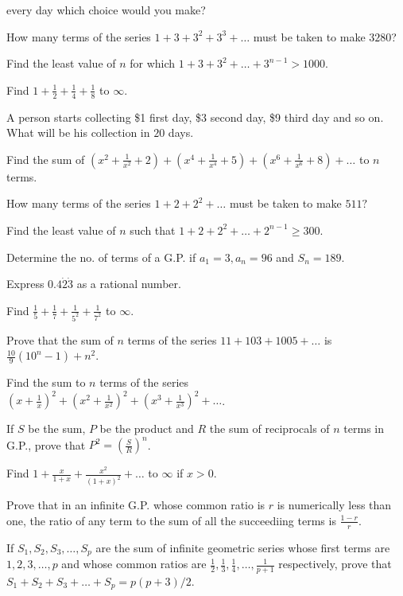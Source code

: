   every day which choice would you make?
\item How many terms of the series $1 + 3 + 3^2 + 3^3 + \ldots$ must be taken to make $3280$?
\item Find the least value of $n$ for which $1 + 3 + 3^2 + \ldots + 3^{n - 1} > 1000$.
\item Find $1 + \frac{1}{2} + \frac{1}{4} + \frac{1}{8}$ to $\infty$.
\item A person starts collecting \$1 first day, \$3 second day, \$9 third day and so on. What will be his collection in $20$
  days.
\item Find the sum of $\left(x^2 + \frac{1}{x^2} + 2\right) + \left(x^4 + \frac{1}{x^4} + 5\right) + \left(x^6 + \frac{1}{x^6} +
  8\right) + \ldots$ to $n$ terms.
\item How many terms of the series $1 + 2 + 2^2 + \ldots$ must be taken to make $511?$
\item Find the least value of $n$ such that $1 + 2 + 2^2 + \ldots + 2^{n - 1} \geq 300$.
\item Determine the no. of terms of a G.P. if $a_1 = 3, a_n = 96$ and $S_n = 189$.
\item Express $0.4\dot{2}\dot{3}$ as a rational number.
\item Find $\frac{1}{5} + \frac{1}{7} + \frac{1}{5^2} + \frac{1}{7^2}$ to $\infty$.
\item Prove that the sum of $n$ terms of the series $11 + 103 + 1005+ \ldots$ is $\frac{10}{9}(10^n - 1) + n^2$.
\item Find the sum to $n$ terms of the series $\left(x + \frac{1}{x}\right)^2 + \left(x^2 + \frac{1}{x^2}\right)^2 + \left(x^3 +
  \frac{1}{x^3}\right)^2 + \ldots$.
\item If $S$ be the sum, $P$ be the product and $R$ the sum of reciprocals of $n$ terms in G.P., prove that $P^2 =
  \left(\frac{S}{R}\right)^n$.
\item Find $1 + \frac{x}{1 + x} + \frac{x^2}{(1 + x)^2} + \ldots$ to $\infty$ if $x > 0$.
\item Prove that in an infinite G.P. whose common ratio is $r$ is numerically less than one, the ratio of any term to the
  sum of all the succeediing terms is $\frac{1 - r}{r}$.
\item If $S_1, S_2, S_3, \ldots, S_p$ are the sum of infinite geometric series whose first terms are $1, 2, 3, \ldots, p$
  and whose common ratios are $\frac{1}{2}, \frac{1}{3}, \frac{1}{4}, \ldots, \frac{1}{p + 1}$ respectively, prove that $S_1 + S_2
  + S_3 + \ldots + S_p = p(p + 3)/2$.
